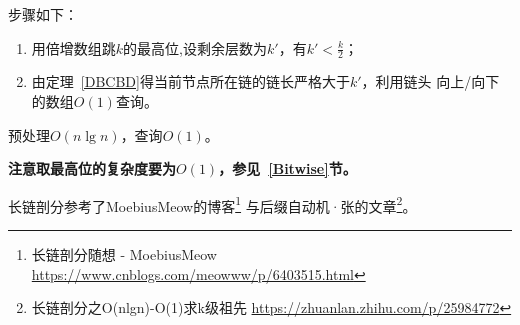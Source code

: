 步骤如下：
\begin{enumerate}
	\item 用倍增数组跳$k$的最高位,设剩余层数为$k'$，有$k'<\frac{k}{2}$；
	\item 由定理~\ref{DBCBD}得当前节点所在链的链长严格大于$k'$，利用链头
	      向上/向下的数组$O(1)$查询。
\end{enumerate}

预处理$O(n\lg n)$，查询$O(1)$。

{\bfseries 注意取最高位的复杂度要为$O(1)$，参见~\ref{Bitwise}节。}

长链剖分参考了MoebiusMeow的博客\footnote{长链剖分随想 - MoebiusMeow
	\url{https://www.cnblogs.com/meowww/p/6403515.html}
}
与后缀自动机·张的文章\footnote{长链剖分之O(nlgn)-O(1)求k级祖先
	\url{https://zhuanlan.zhihu.com/p/25984772}
}。
